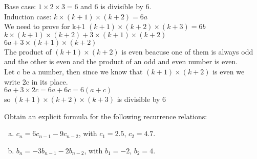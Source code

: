 \documentclass[addpoints,10pt,answers]{exam}
\begin{document}
\begin{questions}
\begin{solution}
Base case: $1\times 2\times 3=6$ and 6 is divisible by 6.\\
Induction case: $k\times (k+1)\times (k+2)=6a$\\
We need to prove for k+1 \hspace{1mm} $(k+1)\times (k+2)\times (k+3) =6b$\\
$k\times (k+1)\times (k+2)+3\times (k+1)\times (k+2)$\\
$6a +3\times (k+1)\times (k+2) $\\
The product of $(k+1)\times (k+2)$ is even beacuse one of them is always odd and the other is even and the product of an odd and even number is even.\\
Let c be a number, then since we know that $(k+1)\times (k+2)$ is even we write 2c in its place.\\
$6a +3\times 2c=6a +6c=6(a+c) $\\
so $(k+1)\times (k+2)\times (k+3)$ is divisible by 6
 
\end{solution}



\question[12]
Obtain an explicit formula for the 
following recurrence relations:

\begin{enumerate}[(a)]
\item $c_n = 6c_{n-1} - 9c_{n-2}$, with $c_1 = 2.5$, $c_2 = 4.7$.
\item $b_n = -3b_{n-1} - 2b_{n-2}$, with $b_1 = -2$, $b_2 = 4$.
\end{enumerate}


\end{questions}
\end{document}
